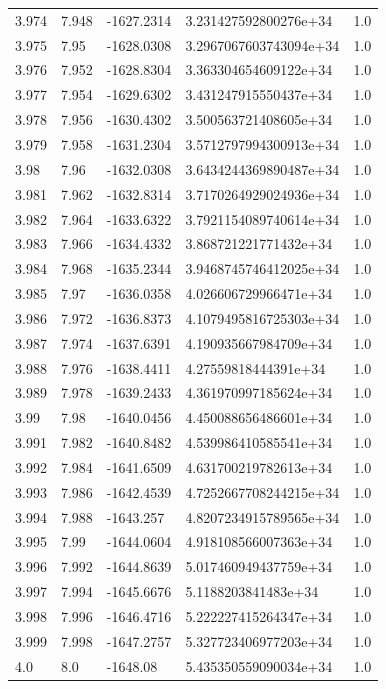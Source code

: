 \begin{tabular}{lllll}
3.974 & 7.948 & -1627.2314 & 3.231427592800276e+34 & 1.0 \\
3.975 & 7.95 & -1628.0308 & 3.2967067603743094e+34 & 1.0 \\
3.976 & 7.952 & -1628.8304 & 3.363304654609122e+34 & 1.0 \\
3.977 & 7.954 & -1629.6302 & 3.431247915550437e+34 & 1.0 \\
3.978 & 7.956 & -1630.4302 & 3.500563721408605e+34 & 1.0 \\
3.979 & 7.958 & -1631.2304 & 3.5712797994300913e+34 & 1.0 \\
3.98 & 7.96 & -1632.0308 & 3.6434244369890487e+34 & 1.0 \\
3.981 & 7.962 & -1632.8314 & 3.7170264929024936e+34 & 1.0 \\
3.982 & 7.964 & -1633.6322 & 3.7921154089740614e+34 & 1.0 \\
3.983 & 7.966 & -1634.4332 & 3.868721221771432e+34 & 1.0 \\
3.984 & 7.968 & -1635.2344 & 3.9468745746412025e+34 & 1.0 \\
3.985 & 7.97 & -1636.0358 & 4.026606729966471e+34 & 1.0 \\
3.986 & 7.972 & -1636.8373 & 4.1079495816725303e+34 & 1.0 \\
3.987 & 7.974 & -1637.6391 & 4.190935667984709e+34 & 1.0 \\
3.988 & 7.976 & -1638.4411 & 4.27559818444391e+34 & 1.0 \\
3.989 & 7.978 & -1639.2433 & 4.361970997185624e+34 & 1.0 \\
3.99 & 7.98 & -1640.0456 & 4.450088656486601e+34 & 1.0 \\
3.991 & 7.982 & -1640.8482 & 4.539986410585541e+34 & 1.0 \\
3.992 & 7.984 & -1641.6509 & 4.631700219782613e+34 & 1.0 \\
3.993 & 7.986 & -1642.4539 & 4.7252667708244215e+34 & 1.0 \\
3.994 & 7.988 & -1643.257 & 4.8207234915789565e+34 & 1.0 \\
3.995 & 7.99 & -1644.0604 & 4.918108566007363e+34 & 1.0 \\
3.996 & 7.992 & -1644.8639 & 5.017460949437759e+34 & 1.0 \\
3.997 & 7.994 & -1645.6676 & 5.1188203841483e+34 & 1.0 \\
3.998 & 7.996 & -1646.4716 & 5.222227415264347e+34 & 1.0 \\
3.999 & 7.998 & -1647.2757 & 5.327723406977203e+34 & 1.0 \\
4.0 & 8.0 & -1648.08 & 5.435350559090034e+34 & 1.0 \\

\end{tabular}

